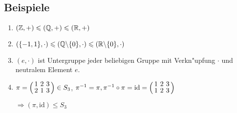 \subsection{Beispiele}
\begin{enumerate}
	\item
	$(\mathbb{Z}, +) \leqslant (\mathbb{Q}, +) \leqslant (\mathbb{R}, +)$
	
	\item
	$(\{-1,1\}, \cdot) \leqslant (\mathbb{Q} \backslash \{0\}, \cdot) \leqslant (\mathbb{R} \backslash \{0\}, \cdot)$
	
	\item
	$(e, \cdot)$ ist Untergruppe jeder beliebigen Gruppe mit Verkn"upfung $\cdot$ und neutralem Element $e$.
	
	\item
	$\pi =
	\aMatrix{ccc}{
		1 & 2 & 3 \\
		2 & 1 & 3
		}
	\in S_3
	$,
	$\pi^{-1} = \pi, \pi^{-1} \circ \pi = \text{id} =
	\aMatrix{ccc}{
		1 & 2 & 3 \\
		1 & 2 & 3
		}
	$
	
	$\Rightarrow (\pi, \text{id})\leqslant S_3$
	
\end{enumerate}
	
